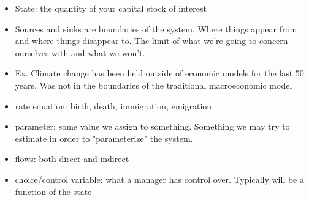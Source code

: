 \documentclass{article}
\begin{document}
\begin{itemize}
    \item State: the quantity of your capital stock of interest
    \item Sources and sinks are boundaries of the system. Where things appear from and where things disappear to. The limit of what we're going to concern ourselves with and what we won't. 
    \item Ex. Climate change has been held outside of economic models for the last 50 years. Was not in the boundaries of the traditional macroeconomic model 
    \item rate equation: birth, death, immigration, emigration 
    \item parameter: some value we assign to something. Something we may try to estimate in order to "parameterize" the system.
    \item flows: both direct and indirect
    \item choice/control variable: what a manager has control over. Typically will be a function of the state
    
\end{itemize}
\end{document}
